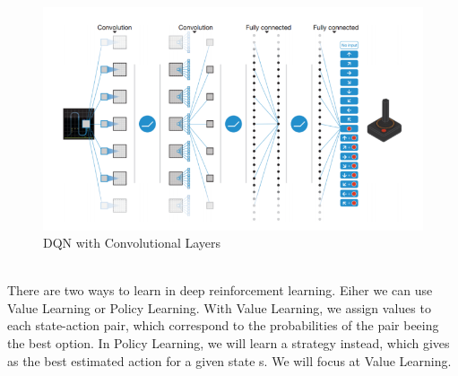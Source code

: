 		\begin{figure}[h!]
			\begin{center}
				\includegraphics[width=\linewidth]{img/v2-67ef75bb7f5e67b2a42645aa821894bf_hd.png}
				\caption{DQN with Convolutional Layers}
				\label{cnndqn}
			\end{center}
		\end{figure}\\
		There are two ways to learn in deep reinforcement learning. Eiher we can use Value Learning or Policy Learning. With Value Learning, we assign values to each state-action pair, which correspond to the probabilities of the pair beeing the best option. In Policy Learning, we will learn a strategy instead, which gives as the best estimated action for a given state s. We will focus at Value Learning. 
			
